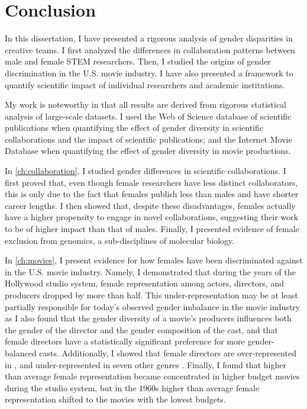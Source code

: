 \chapter{Conclusion}
\label{ch:conclusion}

In this dissertation, I have presented a rigorous analysis of gender disparities in creative teams. I first analyzed the differences in collaboration patterns between male and female STEM researchers. Then, I studied the origins of gender discrimination in the U.S. movie industry. I have also presented a framework to quantify scientific impact of individual researchers and academic institutions.

My work is noteworthy in that all results are derived from rigorous statistical analysis of large-scale datasets. I used the Web of Science database of scientific publications when quantifying the effect of gender diversity in scientific collaborations and the impact of scientific publications; and the Internet Movie Database when quantifying the effect of gender diversity in movie productions.

In \autoref{ch:collaboration}, I studied gender differences in scientific collaborations. I first proved that, even though female researchers have less distinct collaborators, this is only due to the fact that females publish less than males and have shorter career lengths. I then showed that, despite these disadvantages, females actually have a higher propensity to engage in novel collaborations, suggesting their work to be of higher impact than that of males. Finally, I presented evidence of female exclusion from genomics, a sub-disciplines of molecular biology.

In \autoref{ch:movies}, I present evidence for how females have been discriminated against in the U.S. movie industry. Namely, I demonstrated that during the years of the Hollywood studio system, female representation among actors, directors, and producers dropped by more than half. This under-representation may be at least partially responsible for today's observed gender imbalance in the movie industry as I also found that the gender diversity of a movie's producers influences both the gender of the director and the gender composition of the cast, and that female directors have a statistically significant preference for more gender-balanced casts. Additionally, I showed that female directors are over-represented in \overGenres{}, and under-represented in seven other genres \underGenres{}. Finally, I found that higher than average female representation became concentrated in higher budget movies during the studio system, but in the 1960s higher than average female representation shifted to the movies with the lowest budgets.

